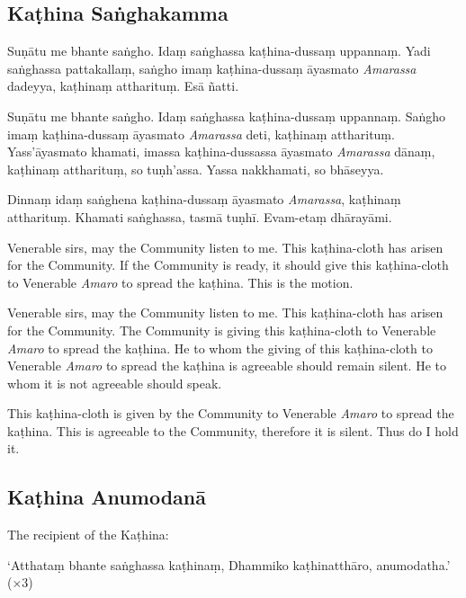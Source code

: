 \subsection{Kaṭhina Saṅghakamma}


Suṇātu me bhante saṅgho. Idaṃ saṅghassa kaṭhina-dussaṃ uppannaṃ. Yadi saṅghassa
pattakallaṃ, saṅgho imaṃ kaṭhina-dussaṃ āyasmato \emph{Amarassa} dadeyya,
kaṭhinaṃ attharituṃ. Esā ñatti.

Suṇātu me bhante saṅgho. Idaṃ saṅghassa kaṭhina-dussaṃ uppannaṃ. Saṅgho imaṃ
kaṭhina-dussaṃ āyasmato \emph{Amarassa} deti, kaṭhinaṃ attharituṃ.
Yass'āyasmato khamati, imassa kaṭhina-dussassa āyasmato \emph{Amarassa} dānaṃ,
kaṭhinaṃ attharituṃ, so tuṇh'assa. Yassa nakkhamati, so bhāseyya.

Dinnaṃ idaṃ saṅghena kaṭhina-dussaṃ āyasmato \emph{Amarassa}, kaṭhinaṃ
attharituṃ. Khamati saṅghassa, tasmā tuṇhī. Evam-etaṃ dhārayāmi.


\begin{english}

Venerable sirs, may the Community listen to me. This kaṭhina-cloth has arisen
for the Community. If the Community is ready, it should give this kaṭhina-cloth
to Venerable \emph{Amaro} to spread the kaṭhina. This is the motion.

Venerable sirs, may the Community listen to me. This kaṭhina-cloth has arisen
for the Community. The Community is giving this kaṭhina-cloth to Venerable
\emph{Amaro} to spread the kaṭhina. He to whom the giving of this kaṭhina-cloth
to Venerable \emph{Amaro} to spread the kaṭhina is agreeable should remain
silent. He to whom it is not agreeable should speak.

This kaṭhina-cloth is given by the Community to Venerable \emph{Amaro} to
spread the kaṭhina. This is agreeable to the Community, therefore it is silent.
Thus do I hold it.

\end{english}

\subsection{Kaṭhina Anumodanā}

The recipient of the Kaṭhina:

‘Atthataṃ bhante saṅghassa kaṭhinaṃ, Dhammiko kaṭhinatthāro, anumodatha.’ (×3)


